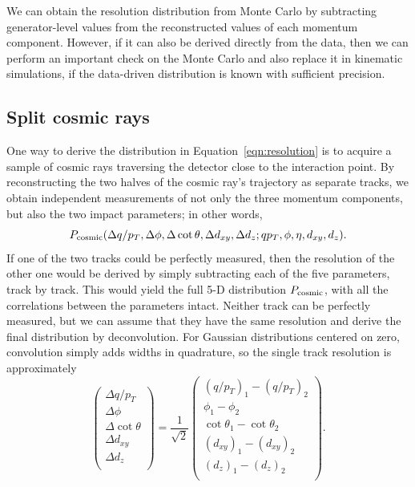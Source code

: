 \documentclass[12pt]{article}
\begin{document}
We can obtain the resolution distribution from Monte Carlo by
subtracting generator-level values from the reconstructed values of
each momentum component.  However, if it can also be derived directly
from the data, then we can perform an important check on the Monte
Carlo and also replace it in kinematic simulations, if the data-driven
distribution is known with sufficient precision.

\subsection{Split cosmic rays}

One way to derive the distribution in Equation~\ref{eqn:resolution} is
to acquire a sample of cosmic rays traversing the detector close to
the interaction point.  By reconstructing the two halves of the cosmic
ray's trajectory as separate tracks, we obtain independent
measurements of not only the three momentum components, but also the
two impact parameters; in other words,
\begin{equation}
P_{\mbox{\scriptsize cosmic}}(\Delta q/p_T, \Delta \phi, \Delta
\cot\theta, \Delta d_{xy}, \Delta d_z; q p_T, \phi, \eta, d_{xy},
d_z)\mbox{.}
\end{equation}
If one of the two tracks could be perfectly measured, then the
resolution of the other one would be derived by simply subtracting
each of the five parameters, track by track.  This would yield the
full 5-D distribution $P_{\mbox{\scriptsize cosmic}}$, with all the
correlations between the parameters intact.  Neither track can be
perfectly measured, but we can assume that they have the same
resolution and derive the final distribution by deconvolution.  For
Gaussian distributions centered on zero, convolution simply adds
widths in quadrature, so the single track resolution is approximately
\begin{equation}
\left(\begin{array}{l}
\Delta q/p_T \\
\Delta \phi \\
\Delta \cot\theta \\
\Delta d_{xy} \\
\Delta d_z \\
\end{array}\right) = \frac{1}{\sqrt{2}}
\left(\begin{array}{c}
(q/p_T)_1 - (q/p_T)_2 \\
\phi_1 - \phi_2 \\
\cot\theta_1 - \cot\theta_2 \\
(d_{xy})_1 - (d_{xy})_2 \\
(d_z)_1 - (d_z)_2 \\
\end{array}\right)\mbox{.}
\end{equation}
\end{document}
